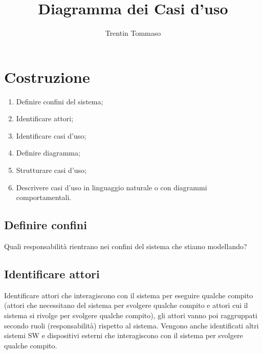 \documentclass{article}
\title{Diagramma dei Casi d'uso}
\author{Trentin Tommaso}
\begin{document}
  \maketitle
  \tableofcontents
  \newpage
  \section{Costruzione}
    \begin{enumerate}
      \item Definire confini del sistema;
      \item Identificare attori;
      \item Identificare casi d'uso;
      \item Definire diagramma;
      \item Strutturare casi d'uso; 
      \item Descrivere casi d'uso in linguaggio naturale o con diagrammi comportamentali.
    \end{enumerate}
    \subsection{Definire confini}
      Quali responsabilità rientrano nei confini del sistema che stiamo modellando?
    \subsection{Identificare attori}
      Identificare attori che interagiscono con il sistema per eseguire qualche compito (attori che necessitano del sistema per svolgere qualche compito e attori cui il sistema si rivolge per svolgere qualche compito), gli attori vanno poi raggruppati secondo ruoli (responsabilità) rispetto al sistema. Vengono anche identificati altri sistemi SW e dispositivi esterni che interagiscono con il sistema per svolgere qualche compito. 
\end{document}
